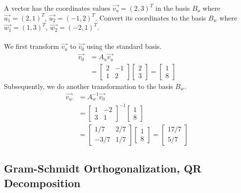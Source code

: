 \begin{exmp}
A vector has the coordinates values $\vec{v_u} = (2,3)^T$ in the basis $B_u$ where $\vec{u_1} = (2,1)^T$, $\vec{u_2} = (-1,2)^T$. Convert its coordinates to the basis $B_w$ where $\vec{w_1} = (1,3)^T$, $\vec{w_2} = (-2,1)^T$.\\
\\
We first transform $\vec{v_u}$ to $\vec{v_0}$ using the standard basis.
\begin{align*}
\vec{v_0} &= A_u\vec{v_u} \\
&=
\begin{bmatrix}
2 & -1\\
1 & 2
\end{bmatrix}
\begin{bmatrix}
2 \\
3
\end{bmatrix}
=
\begin{bmatrix}
1 \\
8
\end{bmatrix}
\end{align*}
Subsequently, we do another transformation to the basis $B_w$.
\begin{align*}
\vec{v_w} &= A_w^{-1}\vec{v_0} \\
&=
\begin{bmatrix}
1 & -2\\
3 & 1
\end{bmatrix}^{-1}
\begin{bmatrix}
1 \\
8
\end{bmatrix} \\
&=
\begin{bmatrix}
1/7 & 2/7\\
-3/7 & 1/7
\end{bmatrix}
\begin{bmatrix}
1 \\
8
\end{bmatrix}
=
\begin{bmatrix}
17/7 \\
5/7
\end{bmatrix}
\end{align*}
\end{exmp}

\subsection{Gram-Schmidt Orthogonalization, QR Decomposition}

